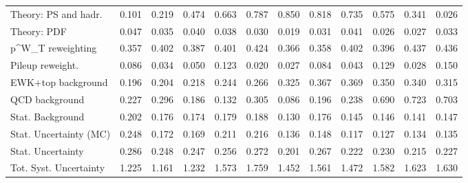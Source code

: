 \begin{tabular}{l|p{0.6cm}p{0.6cm}p{0.6cm}p{0.6cm}p{0.6cm}p{0.6cm}p{0.6cm}p{0.6cm}p{0.6cm}p{0.6cm}p{0.6cm}}
Theory: PS and hadr.                     & 0.101 & 0.219 & 0.474 & 0.663 & 0.787 & 0.850 & 0.818 & 0.735 & 0.575 & 0.341 & 0.026 \\
Theory: PDF                              & 0.047 & 0.035 & 0.040 & 0.038 & 0.030 & 0.019 & 0.031 & 0.041 & 0.026 & 0.027 & 0.033 \\
p^{W}_{T} reweighting                    & 0.357 & 0.402 & 0.387 & 0.401 & 0.424 & 0.366 & 0.358 & 0.402 & 0.396 & 0.437 & 0.436 \\
Pileup reweight.                         & 0.086 & 0.034 & 0.050 & 0.123 & 0.020 & 0.027 & 0.084 & 0.043 & 0.129 & 0.028 & 0.150 \\
EWK+top background                       & 0.196 & 0.204 & 0.218 & 0.244 & 0.266 & 0.325 & 0.367 & 0.369 & 0.350 & 0.340 & 0.315 \\
QCD background                           & 0.227 & 0.296 & 0.186 & 0.132 & 0.305 & 0.086 & 0.196 & 0.238 & 0.690 & 0.723 & 0.703 \\
Stat. Background                         & 0.202 & 0.176 & 0.174 & 0.179 & 0.188 & 0.130 & 0.176 & 0.145 & 0.146 & 0.141 & 0.147 \\
Stat. Uncertainty (MC)                   & 0.248 & 0.172 & 0.169 & 0.211 & 0.216 & 0.136 & 0.148 & 0.117 & 0.127 & 0.134 & 0.135 \\
\hline
Stat. Uncertainty                        & 0.286 & 0.248 & 0.247 & 0.256 & 0.272 & 0.201 & 0.267 & 0.222 & 0.230 & 0.215 & 0.227 \\
\hline
Tot. Syst. Uncertainty                   & 1.225 & 1.161 & 1.232 & 1.573 & 1.759 & 1.452 & 1.561 & 1.472 & 1.582 & 1.623 & 1.630 \\
\hline
\end{tabular}
